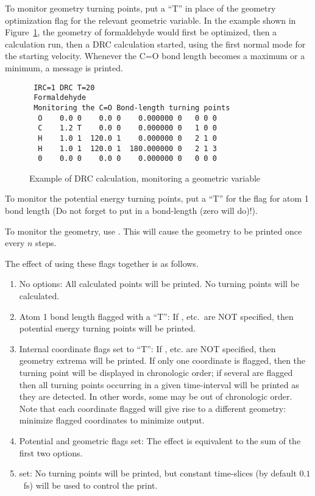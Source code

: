  To monitor geometry turning points, put  a
``T'' in  place  of  the geometry optimization flag for the relevant geometric
variable. In the example shown in Figure~\ref{t}, the geometry of formaldehyde
would first be optimized, then a  calculation run, then a DRC
calculation started, using the first normal mode for the starting velocity.
Whenever the C=O bond length becomes a maximum or a minimum, a message is
printed.

\begin{figure}
\begin{makeimage}
\end{makeimage}
\begin{verbatim}
 IRC=1 DRC T=20
 Formaldehyde
 Monitoring the C=O Bond-length turning points
  O    0.0 0    0.0 0    0.000000 0   0 0 0
  C    1.2 T    0.0 0    0.000000 0   1 0 0
  H    1.0 1  120.0 1    0.000000 0   2 1 0
  H    1.0 1  120.0 1  180.000000 0   2 1 3
  0    0.0 0    0.0 0    0.000000 0   0 0 0
\end{verbatim}
\caption{\label{t} Example of DRC calculation, monitoring a geometric variable}
\end{figure}

To monitor the potential energy turning points, put a ``T'' for  the flag for
atom 1 bond length (Do not forget to put in a bond-length (zero will do)!).

To monitor the geometry, use .  This will cause the geometry to
be printed once every $n$ steps.

The effect of using these flags together is as follows.
\begin{enumerate}
\item No options:  All calculated points will be printed.  No turning points
will be calculated.

\item Atom 1 bond length flagged with a ``T'': If  ,  etc.\ are
NOT  specified,  then  potential  energy turning points will be printed.

\item Internal coordinate flags set to ``T'':  If , etc.  are NOT
specified,  then geometry extrema will be printed.  If only one coordinate is
flagged, then the turning point will be displayed in  chronologic  order; if
several are flagged then all turning points occurring in a given time-interval
will  be  printed  as they  are  detected.   In  other  words,  some  may  be
out of chronologic order.  Note that each coordinate flagged will give rise  to
a different geometry:  minimize flagged coordinates to minimize output.

\item Potential and geometric flags set:  The effect is equivalent to the sum
of the first two options.

\item {} set:  No turning points will be  printed,  but  constant
time-slices  (by  default  $0.1$~fs)  will  be used to control the print.
\end{enumerate}
